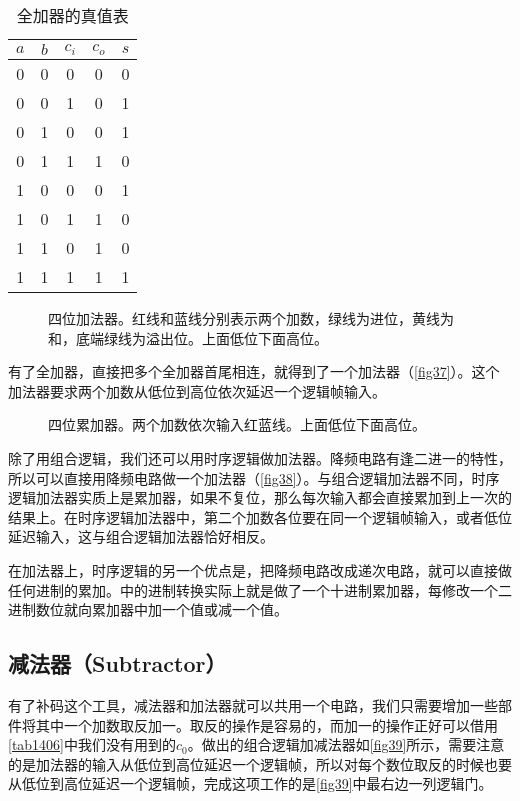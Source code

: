 \begin{table}[!ht]
\centering
\begin{tabular}{ccc|cc}
$a$&$b$&$c_i$&$c_o$&$s$\\\hline
0&0&0&0&0\\
0&0&1&0&1\\
0&1&0&0&1\\
0&1&1&1&0\\
1&0&0&0&1\\
1&0&1&1&0\\
1&1&0&1&0\\
1&1&1&1&1
\end{tabular}
\caption{全加器的真值表}\label{tab1819}
\end{table}

\begin{figure}[!ht]
\centering
{}%
%
\caption{四位加法器。红线和蓝线分别表示两个加数，绿线为进位，黄线为和，底端绿线为溢出位。上面低位下面高位。}\label{fig37}
\end{figure}

有了全加器，直接把多个全加器首尾相连，就得到了一个加法器（\autoref{fig37}）。这个加法器要求两个加数从低位到高位依次延迟一个逻辑帧输入。

\begin{figure}[!ht]
\centering
{}%
%
\caption{四位累加器。两个加数依次输入红蓝线。上面低位下面高位。}\label{fig38}
\end{figure}

除了用组合逻辑，我们还可以用时序逻辑做加法器。降频电路有逢二进一的特性，所以可以直接用降频电路做一个加法器（\autoref{fig38}）。与组合逻辑加法器不同，时序逻辑加法器实质上是累加器，如果不复位，那么每次输入都会直接累加到上一次的结果上。在时序逻辑加法器中，第二个加数各位要在同一个逻辑帧输入，或者低位延迟输入，这与组合逻辑加法器恰好相反。

在加法器上，时序逻辑的另一个优点是，把降频电路改成递次电路，就可以直接做任何进制的累加。中的进制转换实际上就是做了一个十进制累加器，每修改一个二进制数位就向累加器中加一个值或减一个值。

\subsection{减法器（Subtractor）}
有了补码这个工具，减法器和加法器就可以共用一个电路，我们只需要增加一些部件将其中一个加数取反加一。取反的操作是容易的，而加一的操作正好可以借用\autoref{tab1406}中我们没有用到的$c_0$。做出的组合逻辑加减法器如\autoref{fig39}所示，需要注意的是加法器的输入从低位到高位延迟一个逻辑帧，所以对每个数位取反的时候也要从低位到高位延迟一个逻辑帧，完成这项工作的是\autoref{fig39}中最右边一列逻辑门。

